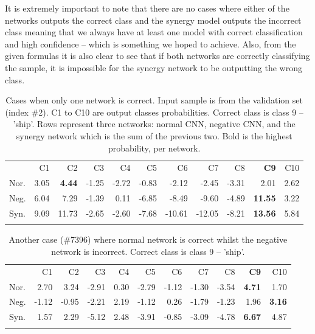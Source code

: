 \documentclass[b5paper]{book}
\begin{document}
It is extremely important to note that there are no cases where either of the networks outputs the correct class and the synergy model outputs the incorrect class meaning that we always have at least one model with correct classification and high confidence -- which is something we hoped to achieve. Also, from the given formulas it is also clear to see that if both networks are correctly classifying the sample, it is impossible for the synergy network to be outputting the wrong class.


\begin{table}
\centering
\caption{Cases when only one network is correct. Input sample is from the validation set (index \#2). C1 to C10 are output classes probabilities. Correct class is class 9 -- 'ship'. Rows represent three networks: normal CNN, negative CNN, and the synergy network which is the sum of the previous two. Bold is the highest probability, per network.}
\label{tab:3}
\tabcolsep=0.04cm
\begin{tabular}{lrrrrrrrrrr}
\hline\noalign{\smallskip}
 & C1 & C2 & C3 & C4 & C5 & C6 & C7 & C8 & \textbf{C9} & C10 \\
\noalign{\smallskip}\hline\noalign{\smallskip}
Nor. & 3.05 & \textbf{4.44} & -1.25 & -2.72 & -0.83 & -2.12 & -2.45 & -3.31 & 2.01 & 2.62 \\
Neg. & 6.04 & 7.29 & -1.39 & 0.11 & -6.85 & -8.49 & -9.60 & -4.89 & \textbf{11.55} & 3.22 \\
Syn. & 9.09 & 11.73 & -2.65 & -2.60 & -7.68 & -10.61 & -12.05 & -8.21 & \textbf{13.56} & 5.84 \\
\noalign{\smallskip}\hline
\end{tabular}
\end{table}

\begin{table}
\centering
\caption{Another case (\#7396) where normal network is correct whilst the negative network is incorrect. Correct class is class 9 -- 'ship'.}
\label{tab:4}
\tabcolsep=0.06cm
\begin{tabular}{lrrrrrrrrrr}
\hline\noalign{\smallskip}
 & C1 & C2 & C3 & C4 & C5 & C6 & C7 & C8 & \textbf{C9} & C10 \\
\noalign{\smallskip}\hline\noalign{\smallskip}
Nor. & 2.70 & 3.24 & -2.91 & 0.30 & -2.79 & -1.12 & -1.30 & -3.54 & \textbf{4.71} & 1.70 \\
Neg. & -1.12 & -0.95 & -2.21 & 2.19 & -1.12 & 0.26 & -1.79 & -1.23 & 1.96 & \textbf{3.16} \\
Syn. & 1.57 & 2.29 & -5.12 & 2.48 & -3.91 & -0.85 & -3.09 & -4.78 & \textbf{6.67} & 4.87 \\
\noalign{\smallskip}\hline
\end{tabular}
\end{table}
\end{document}

